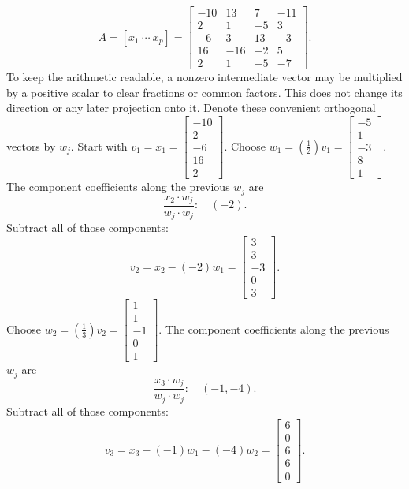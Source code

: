 \[A=[x_1\ \cdots\ x_p]=\left[\begin{array}{rrrr}-10&13&7&-11\\2&1&-5&3\\-6&3&13&-3\\16&-16&-2&5\\2&1&-5&-7\end{array}\right].\]
To keep the arithmetic readable, a nonzero intermediate vector may be multiplied by a positive scalar to clear fractions or common factors. This does not change its direction or any later projection onto it. Denote these convenient orthogonal vectors by $w_j$.
Start with $v_1=x_1=\left[\begin{array}{r}-10\\2\\-6\\16\\2\end{array}\right]$.
Choose $w_{1}=(\frac{1}{2})v_{1}=\left[\begin{array}{r}-5\\1\\-3\\8\\1\end{array}\right]$.
The component coefficients along the previous $w_j$ are
\[\frac{x_{2}\cdot w_j}{w_j\cdot w_j}:\quad(-2).\]
Subtract all of those components:
\[v_{2}=x_{2}-(-2)w_{1}=\left[\begin{array}{r}3\\3\\-3\\0\\3\end{array}\right].\]
Choose $w_{2}=(\frac{1}{3})v_{2}=\left[\begin{array}{r}1\\1\\-1\\0\\1\end{array}\right]$.
The component coefficients along the previous $w_j$ are
\[\frac{x_{3}\cdot w_j}{w_j\cdot w_j}:\quad(-1,-4).\]
Subtract all of those components:
\[v_{3}=x_{3}-(-1)w_{1}-(-4)w_{2}=\left[\begin{array}{r}6\\0\\6\\6\\0\end{array}\right].\]

